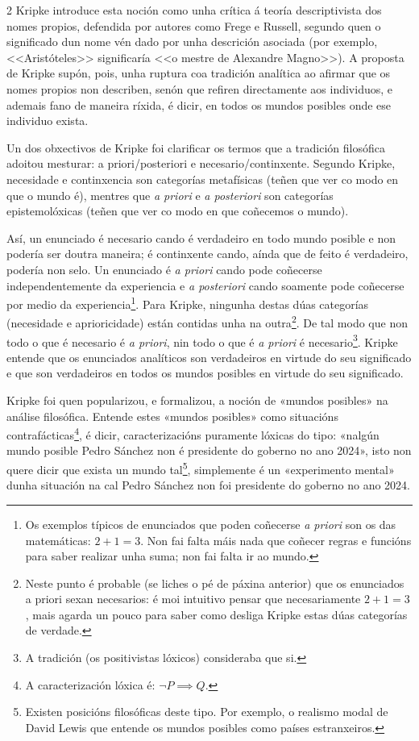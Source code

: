 \begin{multicols}{2}
Kripke introduce esta noción como unha crítica á teoría descriptivista dos
nomes propios, defendida por autores como Frege e Russell, segundo quen o
significado dun nome vén dado por unha descrición asociada (por exemplo,
<<Aristóteles>> significaría <<o mestre de Alexandre Magno>>). A proposta de
Kripke supón, pois, unha ruptura coa tradición analítica ao afirmar que os
nomes propios non describen, senón que refiren directamente aos individuos, e
ademais fano de maneira ríxida, é dicir, en todos os mundos posibles onde ese
individuo exista.

Un dos obxectivos de Kripke foi clarificar os termos que a tradición filosófica
adoitou mesturar: a priori/posteriori e necesario/continxente. Segundo Kripke,
necesidade e continxencia son categorías metafísicas (teñen que ver co modo en
que o mundo é), mentres que \textit{a priori} e \textit{a posteriori} son
categorías epistemolóxicas (teñen que ver co modo en que coñecemos o mundo).

Así, un enunciado é necesario cando é verdadeiro en todo mundo posible e non
podería ser doutra maneira; é continxente cando, aínda que de feito é
verdadeiro, podería non selo. Un enunciado é \textit{a priori} cando pode
coñecerse independentemente da experiencia e \textit{a posteriori} cando
soamente pode coñecerse por medio da experiencia\footnote{Os exemplos típicos
de enunciados que poden coñecerse \textit{a priori} son os das matemáticas:
$2+1=3$. Non fai falta máis nada que coñecer regras e funcións para saber
realizar unha suma; non fai falta ir ao mundo.}. Para Kripke, ningunha destas
dúas categorías (necesidade e aprioricidade) están contidas unha na
outra\footnote{Neste punto é probable (se liches o pé de páxina anterior) que
os enunciados a priori sexan necesarios: é moi intuitivo pensar que
necesariamente $2+1=3$, mais agarda un pouco para saber como desliga Kripke
estas dúas categorías de verdade.}. De tal modo que non todo o que é necesario
é \textit{a priori}, nin todo o que é \textit{a priori} é necesario\footnote{A
tradición (os positivistas lóxicos) consideraba que si.}. Kripke entende que os
enunciados analíticos son verdadeiros en virtude do seu significado e que son
verdadeiros en todos os mundos posibles en virtude do seu significado.

Kripke foi quen popularizou, e formalizou, a noción de «mundos posibles» na
análise filosófica. Entende estes «mundos posibles» como situacións
contrafácticas\footnote{A caracterización lóxica é: $\neg P \implies Q $.}, é
dicir, caracterizacións puramente lóxicas do tipo: «nalgún mundo posible Pedro
Sánchez non é presidente do goberno no ano 2024», isto non quere dicir que
exista un mundo tal\footnote{Existen posicións filosóficas deste tipo. Por
exemplo, o realismo modal de David Lewis que entende os mundos posibles como
países estranxeiros.}, simplemente é un «experimento mental» dunha situación na
cal Pedro Sánchez non foi presidente do goberno no ano 2024.


\end{multicols}
